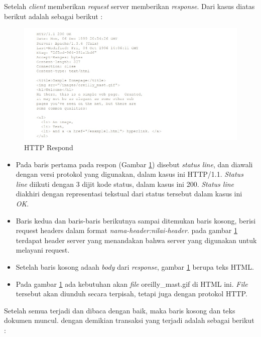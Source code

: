 Setelah \textit{client} memberikan \textit{request} server memberikan \textit{response}. Dari kasus diatas berikut adalah sebagai berikut :
			\begin{figure}[H]
				\centering		
				\includegraphics[scale=0.6]{Gambar/respondserver.jpg}
				\caption[HTTP Respond]{HTTP Respond\cite{wong2000http}}
				\label{fig:httprespond}	
			\end{figure}
 \begin{itemize}
	\item Pada baris pertama pada respon (Gambar \ref{fig:httprespond}) disebut \textit{status line}, dan diawali dengan versi protokol yang digunakan, dalam kasus ini HTTP/1.1. \textit{Status line} diikuti dengan 3 dijit kode status, dalam kasus ini 200. \textit{Status line} diakhiri dengan representasi tekstual dari status tersebut dalam kasus ini \textit{OK}.
	\item Baris kedua dan baris-baris berikutnya sampai ditemukan baris kosong, berisi request headers dalam format \textit{nama-header:nilai-header}. pada gambar \ref{fig:httprespond} terdapat header server yang menandakan bahwa server yang digunakan untuk melayani request.
	\item Setelah baris kosong adaah \textit{body} dari \textit{response}, gambar \ref{fig:httprespond} berupa teks HTML.
	\item Pada gambar \ref{fig:httprespond} ada kebutuhan akan \textit{file} oreilly\_mast.gif di HTML ini. \textit{File} tersebut akan diunduh secara terpisah, tetapi juga dengan protokol HTTP.
\end{itemize}

Setelah semua terjadi dan dibaca dengan baik, maka baris kosong dan teks dokumen muncul. dengan demikian transaksi yang terjadi adalah sebagai berikut : 

